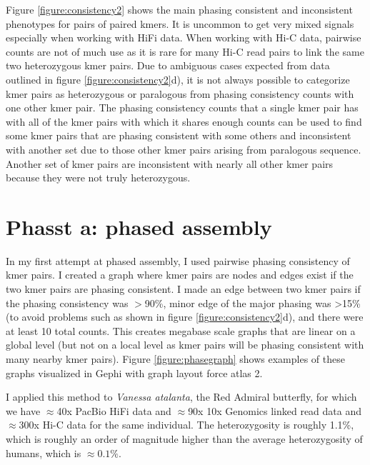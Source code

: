 \par{
Figure \ref{figure:consistency2} shows the main phasing consistent and inconsistent phenotypes for pairs of paired kmers. It is uncommon to get very mixed signals especially when working with HiFi data. When working with Hi-C data, pairwise counts are not of much use as it is rare for many Hi-C read pairs to link the same two heterozygous kmer pairs. Due to ambiguous cases expected from data outlined in figure \ref{figure:consistency2}d), it is not always possible to categorize kmer pairs as heterozygous or paralogous from phasing consistency counts with one other kmer pair. The phasing consistency counts that a single kmer pair has with all of the kmer pairs with which it shares enough counts can be used to find some kmer pairs that are phasing consistent with some others and inconsistent with another set due to those other kmer pairs arising from paralogous sequence. Another set of kmer pairs are inconsistent with nearly all other kmer pairs because they were not truly heterozygous.
}





\section{Phasst a: phased assembly}

\par{
In my first attempt at phased assembly, I used pairwise phasing consistency of kmer pairs. I created a graph where kmer pairs are nodes and edges exist if the two kmer pairs are phasing consistent. I made an edge between two kmer pairs if the phasing consistency was $>$90\%, minor edge of the major phasing was >15\% (to avoid problems such as shown in figure \ref{figure:consistency2}d), and there were at least 10 total counts. This creates megabase scale graphs that are linear on a global level (but not on a local level as kmer pairs will be phasing consistent with many nearby kmer pairs). Figure \ref{figure:phasegraph} shows examples of these graphs visualized in Gephi with graph layout force atlas 2\cite{gephi}\cite{forceatlas2}. 
}

\par{
I applied this method to \textit{Vanessa atalanta}, the Red Admiral butterfly, for which we have $\approx$40x PacBio HiFi data and $\approx$90x 10x Genomics linked read data and $\approx$300x Hi-C data for the same individual. The heterozygosity is roughly 1.1\%, which is roughly an order of magnitude higher than the average heterozygosity of humans, which is $\approx0.1\%$.
}

